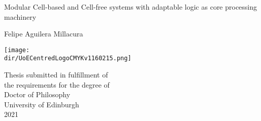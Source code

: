 

\thispagestyle{empty}

\begin{minipage}{\textwidth}
\end{minipage}
\begin{center}
\vspace{2cm}
{ \Huge Modular Cell-based and Cell-free systems with adaptable logic as core processing machinery
  \par
  \vspace{0.5cm} 
{\Large Felipe Aguilera Millacura  \par}
}
\end{center}
\vfill
\begin{center}
\vspace{6cm}    
\centerline{\texttt{[image: \\dir/UoECentredLogoCMYKv1160215.png]}}
\vspace{0.5cm}
Thesis submitted in fulfillment of\\
the requirements for the degree of\\ 
Doctor of Philosophy\\
University of Edinburgh \\
2021
\end{center}

\newpage
\thispagestyle{empty}


